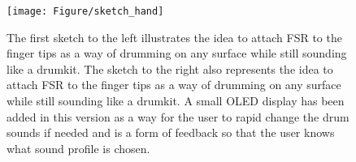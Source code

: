 \begin{figure}[H]
\centering
\texttt{[image: Figure/sketch\_hand]}
\caption{The first sketch to the left illustrates the idea to attach FSR to the finger tips as a way of drumming on any surface while still sounding like a drumkit. The sketch to the right also represents the idea to attach FSR to the finger tips as a way of drumming on any surface while still sounding like a drumkit. A small OLED display has been added in this version as a way for the user to rapid change the drum sounds if needed and is a form of feedback so that the user knows what sound profile is chosen.}
\label{fig:sketch_hand}
\end{figure}